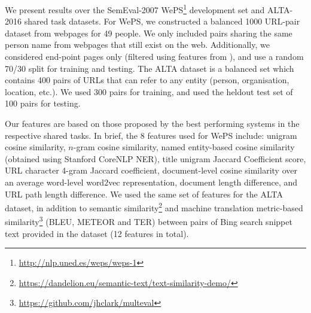 \documentclass[letterpaper]{sig-alternate-2013}
\begin{document}
We present results over the SemEval-2007 WePS\footnote{\url{http://nlp.uned.es/weps/weps-1}} development set and ALTA-2016 shared task datasets. For WePS, we constructed a balanced 1000 URL-pair dataset from webpages for 49 people. We only included pairs sharing the same person name from webpages that still exist on the web. Additionally, we considered end-point pages only (filtered using features from \cite{chisholm2016akbc}), and use a random 70/30 split for training and testing. The ALTA dataset is a balanced set which contains 400 pairs of URLs that can refer to any entity (person, organisation, location, etc.). We used 300 pairs for training, and used the heldout test set of 100 pairs for testing. 

Our features are based on those proposed by the best performing systems in the respective shared tasks. In brief, the 8 features used for WePS include: unigram cosine similarity, $n$-gram cosine similarity,
named entity-based cosine similarity (obtained using Stanford CoreNLP NER), title unigram Jaccard Coefficient score, URL character 4-gram Jaccard coefficient, document-level cosine similarity over an average word-level word2vec representation, document length difference, and URL path length difference. We used the same set of features for the ALTA dataset, in addition to semantic similarity\footnote{\url{https://dandelion.eu/semantic-text/text-similarity-demo/}} and machine translation metric-based similarity\footnote{\url{https://github.com/jhclark/multeval}} (BLEU, METEOR and TER) between pairs of Bing search snippet text provided in the dataset (12 features in total).
\end{document}
